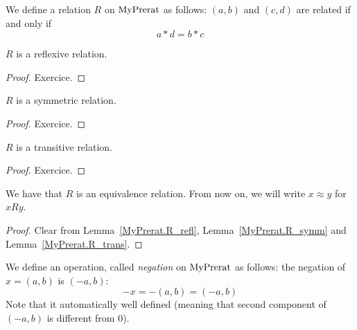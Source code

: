 \begin{definition}
    \label{MyPrerat.R}
    \leanok
We define a relation $R$ on $\mathrm{MyPrerat}$ as follows: $(a,b)$ and $(c, d)$ are related if and only if
\[
a * d = b * c
\]
\end{definition}

\begin{lemma}
$R$ is a reflexive relation.
    \label{MyPrerat.R_refl}
    \leanok
\end{lemma}
\begin{proof}
    \leanok
    Exercice.
\end{proof}

\begin{lemma}
$R$ is a symmetric relation.
    \label{MyPrerat.R_symm}
    \leanok
\end{lemma}
\begin{proof}
    \leanok
    Exercice.
\end{proof}

\begin{lemma}
$R$ is a transitive relation.
    \label{MyPrerat.R_trans}
    \leanok
\end{lemma}
\begin{proof}
    \leanok
    Exercice.
\end{proof}

\begin{lemma}
    \label{MyPrerat.R_equiv}
    \leanok
We have that $R$ is an equivalence relation. From now on, we will write $x \approx y$ for
$x R y$.
\end{lemma}
\begin{proof}
    \leanok
Clear from Lemma~\ref{MyPrerat.R_refl}, Lemma~\ref{MyPrerat.R_symm} and Lemma~\ref{MyPrerat.R_trans}.
\end{proof}

\begin{definition}
    \label{MyPrerat.neg}
    \leanok
We define an operation, called \emph{negation} on $\mathrm{MyPrerat}$ as follows: the negation of $x = (a,b)$ is
$(-a,b)$:
\[
-x = -(a,b) = (-a,b)
\]
Note that it automatically well defined (meaning that second component of $(-a,b)$ is different from $0$).
\end{definition}

